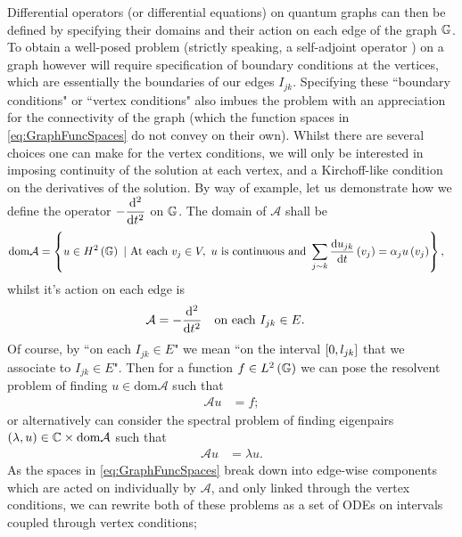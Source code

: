 Differential operators (or differential equations) on quantum graphs can then be defined by specifying their domains and their action on each edge of the graph $\mathbb{G}$.
To obtain a well-posed problem (strictly speaking, a self-adjoint operator ) on a graph however will require specification of boundary conditions at the vertices, which are essentially the boundaries of our edges $I_{jk}$.
Specifying these ``boundary conditions" or ``vertex conditions" also imbues the problem with an appreciation for the connectivity of the graph (which the function spaces in \ref{eq:GraphFuncSpaces} do not convey on their own).
Whilst there are several choices one can make for the vertex conditions, we will only be interested in imposing continuity of the solution at each vertex, and a Kirchoff-like condition on the derivatives of the solution.
By way of example, let us demonstrate how we define the operator $-\dfrac{\mathrm{d}^2 }{\mathrm{d} {t}^2}$ on $\mathbb{G}$.
The domain of $\mathcal{A}$ shall be
\begin{align} \label{eq:ExampleOppDomainDef}
	\mathrm{dom}\mathcal{A} &= \clbracs{ u\in H^2\bracs{\graph} \ \vert \ \text{At each } v_j\in V, \ u \text{ is continuous and } \sum_{j\con k}\diff{u_{jk}}{t}\bracs{v_j} = \alpha_j u\bracs{v_j} },
\end{align}
whilst it's action on each edge is
\begin{align} \label{eq:ExampleOppEdgeDef}
	\mathcal{A} &= -\dfrac{\mathrm{d}^2 }{\mathrm{d} {t}^2} \quad\text{on each } I_{jk}\in E.
\end{align}
Of course, by ``on each $I_{jk}\in E$" we mean ``on the interval $\left[ 0,l_{jk} \right]$ that we associate to $I_{jk}\in E$".
Then for a function $f\in L^2\left( \mathbb{G} \right)$ we can pose the resolvent problem of finding $u\in\mathrm{dom}\mathcal{A}$ such that
\begin{align*}
	\mathcal{A}u &= f;
\end{align*}
or alternatively can consider the spectral problem of finding eigenpairs $\left( \lambda,u \right)\in\mathbb{C}\times\mathrm{dom}\mathcal{A}$ such that
\begin{align*}
	\mathcal{A}u &= \lambda u.
\end{align*}
As the spaces in \eqref{eq:GraphFuncSpaces} break down into edge-wise components which are acted on individually by $\mathcal{A}$, and only linked through the vertex conditions, we can rewrite both of these problems as a set of ODEs on intervals coupled through vertex conditions;

